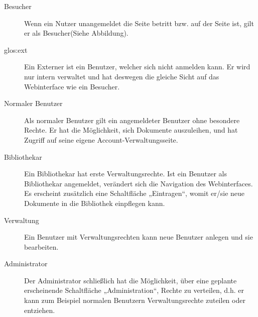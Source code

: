 \begin{description}
\item[Besucher] Wenn ein Nutzer unangemeldet die Seite betritt bzw. auf der Seite ist, gilt er als Besucher(Siehe Abbildung).
\item [\Gls{glos:ext}] Ein Externer ist ein Benutzer, welcher sich nicht anmelden kann. Er wird nur intern verwaltet und hat deswegen die gleiche Sicht
auf das Webinterface wie ein Besucher.
\item [Normaler Benutzer] Als normaler Benutzer gilt ein angemeldeter Benutzer ohne besondere Rechte. Er hat die Möglichkeit, sich Dokumente auszuleihen, und hat Zugriff auf seine eigene Account-Verwaltungsseite.
\item [Bibliothekar] Ein Bibliothekar hat erste Verwaltungsrechte. Ist ein Benutzer als Bibliothekar angemeldet, verändert sich die Navigation des Webinterfaces. Es erscheint zusätzlich eine Schaltfläche „Eintragen“, womit er/sie neue Dokumente in die Bibliothek einpflegen kann.
\item [Verwaltung] Ein Benutzer mit Verwaltungsrechten kann neue Benutzer anlegen und sie bearbeiten.
\item [Administrator] Der Administrator schließlich hat die Möglichkeit, über eine geplante erscheinende Schaltfläche „Administration“, Rechte zu verteilen, d.h. er kann zum Beispiel normalen Benutzern Verwaltungsrechte zuteilen oder entziehen. 
\end{description}











 
